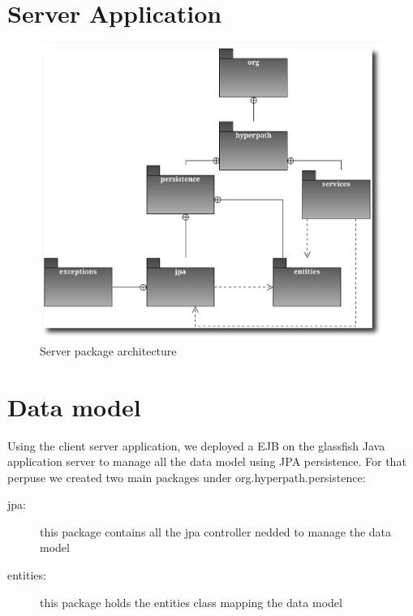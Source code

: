 

\section{Server Application}

  \begin{figure}[p]
    \begin{center}
      \includegraphics[scale=0.5]{Figures/HyperPath_server_packages.eps}
     \end{center}
     \caption{Server package architecture}
     \label{Server package architecture}
  \end{figure}
\pagebreak
\section{Data model}
Using the client server application, we deployed a EJB on the glassfish Java
application server to manage all the data model using JPA persistence. For that
perpuse we created two main packages under org.hyperpath.persistence:
\begin{description}
  \item[jpa: ] this package contains all the jpa controller nedded to manage the
  data model
  \item[entities: ] this package holds the entities class mapping the data model
\end{description}

